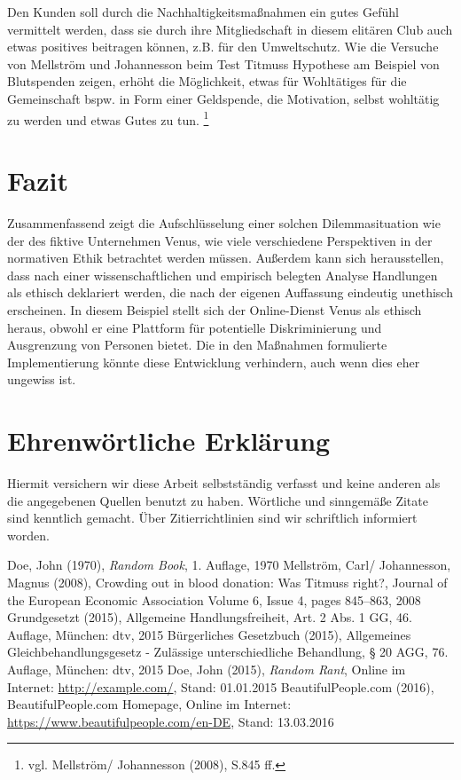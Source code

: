 \documentclass[a4paper, fontsize=12pt, parskip=full, toc=bibliographynumbered]{scrreprt}
\begin{document}
Den Kunden soll durch die Nachhaltigkeitsmaßnahmen ein gutes Gefühl vermittelt werden, dass sie durch ihre Mitgliedschaft in diesem elitären Club auch etwas positives beitragen können, z.B. für den Umweltschutz. Wie die Versuche von Mellström und Johannesson beim Test Titmuss Hypothese am Beispiel von Blutspenden zeigen, erhöht die Möglichkeit, etwas für Wohltätiges für die Gemeinschaft bspw. in Form einer Geldspende, die Motivation, selbst wohltätig zu werden und etwas Gutes zu tun. \footnote{vgl. Mellström/ Johannesson (2008), S.845 ff.} 

\chapter{Fazit}

Zusammenfassend zeigt die Aufschlüsselung einer solchen Dilemmasituation wie der des fiktive Unternehmen Venus, wie viele verschiedene Perspektiven in der normativen Ethik betrachtet werden müssen. Außerdem kann sich herausstellen, dass nach einer wissenschaftlichen und empirisch belegten Analyse Handlungen als ethisch deklariert werden, die nach der eigenen Auffassung eindeutig unethisch erscheinen. In diesem Beispiel stellt sich der Online-Dienst Venus als ethisch heraus, obwohl er eine Plattform für potentielle Diskriminierung und Ausgrenzung von Personen bietet. Die in den Maßnahmen formulierte Implementierung könnte diese Entwicklung verhindern, auch wenn dies eher ungewiss ist. 

\chapter{Ehrenwörtliche Erklärung}

Hiermit versichern wir diese Arbeit selbstständig verfasst und keine
anderen als die angegebenen Quellen benutzt zu haben.  Wörtliche und
sinngemäße Zitate sind kenntlich gemacht.  Über Zitierrichtlinien
sind wir schriftlich informiert worden.

\renewcommand{\bibname}{Quellenverzeichnis}
\begin{thebibliography}{9}
 Doe, John (1970), \emph{Random Book}, 1. Auflage, 1970
 Mellström, Carl/ Johannesson, Magnus (2008), Crowding out in blood donation: Was Titmuss right?, Journal of the European Economic Association Volume 6, Issue 4, pages 845–863, 2008
 Grundgesetzt (2015), Allgemeine Handlungsfreiheit, Art. 2 Abs. 1 GG, 46. Auflage, München: dtv, 2015
 Bürgerliches Gesetzbuch (2015), Allgemeines Gleichbehandlungsgesetz - Zulässige unterschiedliche Behandlung, § 20 AGG, 76. Auflage, München: dtv,  2015
 Doe, John (2015), \emph{Random Rant}, Online im
  Internet: \url{http://example.com/}, Stand: 01.01.2015
 BeautifulPeople.com (2016), BeautifulPeople.com Homepage, Online im Internet: \url{https://www.beautifulpeople.com/en-DE}, Stand: 13.03.2016
\end{thebibliography}
\end{document}
